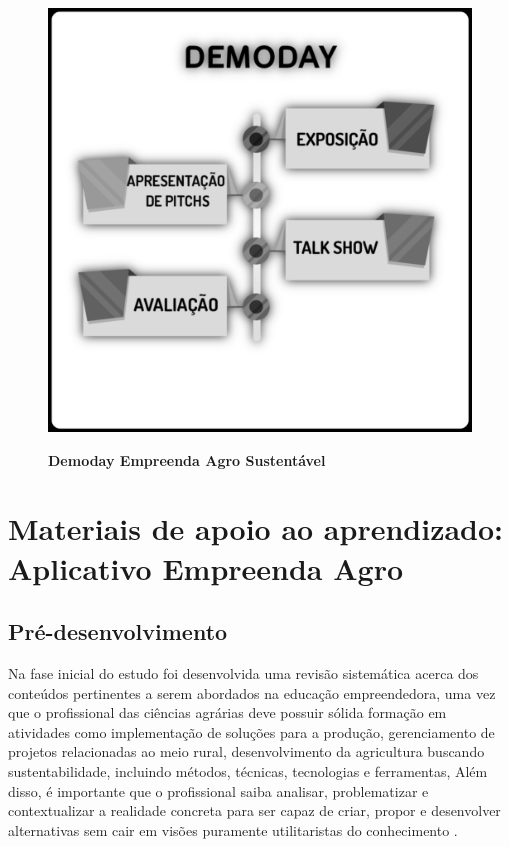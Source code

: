 \begin{figure}[H]
\centering
\caption{\textbf{Demoday Empreenda Agro Sustentável}}
\includegraphics[scale=0.2]{Imagens/workshop-04.png}
\label{figura_33}
\end{figure}


\section{Materiais de apoio ao aprendizado: Aplicativo Empreenda Agro}




\subsection{Pré-desenvolvimento}

Na fase inicial do estudo foi desenvolvida uma revisão sistemática acerca dos conteúdos pertinentes a serem abordados na educação empreendedora, uma vez que o profissional das ciências agrárias deve possuir sólida formação em atividades como implementação de soluções para a produção, gerenciamento de projetos relacionadas ao meio rural, desenvolvimento da agricultura buscando sustentabilidade, incluindo métodos, técnicas, tecnologias e ferramentas, Além disso, é importante que o profissional saiba analisar, problematizar e contextualizar a realidade concreta para ser capaz de criar, propor e desenvolver alternativas sem cair em visões puramente utilitaristas do conhecimento \cite{cavalcanti_da_2019}. 


